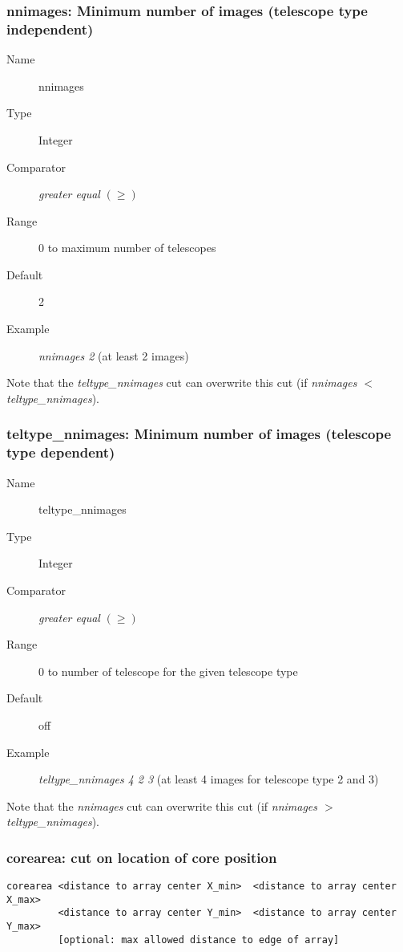 \documentclass[titlepage,a4paper,twoside,11pt]{report}
\begin{document}
\subsubsection{nnimages: Minimum number of images (telescope type independent)}

\begin{description}
\item[Name] nnimages
\item[Type] Integer
\item[Comparator] {\it greater equal } $(\geq)$
\item[Range] 0 to maximum number of telescopes
\item[Default] 2
\item[Example]  {\it nnimages 2}   (at least 2 images)
\end{description}

Note that the  {\it teltype\_nnimages} cut can overwrite this cut (if {\it nnimages $<$ teltype\_nnimages}).

\subsubsection{teltype\_nnimages: Minimum number of images (telescope type dependent)} 

\begin{description}
\item[Name] teltype\_nnimages
\item[Type] Integer
\item[Comparator] {\it greater equal } $(\geq)$
\item[Range] 0 to number of telescope for the given telescope type
\item[Default] off
\item[Example]  {\it teltype\_nnimages 4 2 3}   (at least 4 images for telescope type 2 and 3)
\end{description}

Note that the  {\it nnimages} cut can overwrite this cut (if {\it nnimages $>$ teltype\_nnimages}).

\subsubsection{corearea: cut on location of core position}

\begin{lstlisting}
corearea <distance to array center X_min>  <distance to array center X_max> 
         <distance to array center Y_min>  <distance to array center Y_max>
         [optional: max allowed distance to edge of array]
\end{lstlisting}
\end{document}
